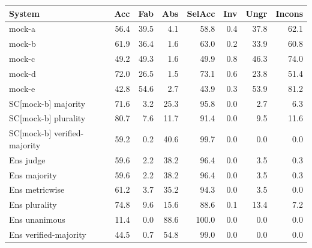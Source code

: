 \begin{tabular}{lrrrrrrr}
\toprule
System & Acc & Fab & Abs & SelAcc & Inv & Ungr & Incons \\
\midrule
mock-a & 56.4 & 39.5 & 4.1 & 58.8 & 0.4 & 37.8 & 62.1 \\
mock-b & 61.9 & 36.4 & 1.6 & 63.0 & 0.2 & 33.9 & 60.8 \\
mock-c & 49.2 & 49.3 & 1.6 & 49.9 & 0.8 & 46.3 & 74.0 \\
mock-d & 72.0 & 26.5 & 1.5 & 73.1 & 0.6 & 23.8 & 51.4 \\
mock-e & 42.8 & 54.6 & 2.7 & 43.9 & 0.3 & 53.9 & 81.2 \\
\midrule
SC[mock-b] majority & 71.6 & 3.2 & 25.3 & 95.8 & 0.0 & 2.7 & 6.3 \\
SC[mock-b] plurality & 80.7 & 7.6 & 11.7 & 91.4 & 0.0 & 9.5 & 11.6 \\
SC[mock-b] verified-majority & 59.2 & 0.2 & 40.6 & 99.7 & 0.0 & 0.0 & 0.0 \\
\midrule
Ens judge & 59.6 & 2.2 & 38.2 & 96.4 & 0.0 & 3.5 & 0.3 \\
Ens majority & 59.6 & 2.2 & 38.2 & 96.4 & 0.0 & 3.5 & 0.3 \\
Ens metricwise & 61.2 & 3.7 & 35.2 & 94.3 & 0.0 & 3.5 & 0.0 \\
Ens plurality & 74.8 & 9.6 & 15.6 & 88.6 & 0.1 & 13.4 & 7.2 \\
Ens unanimous & 11.4 & 0.0 & 88.6 & 100.0 & 0.0 & 0.0 & 0.0 \\
Ens verified-majority & 44.5 & 0.7 & 54.8 & 99.0 & 0.0 & 0.0 & 0.0 \\
\bottomrule
\end{tabular}

